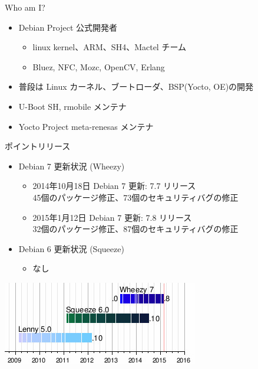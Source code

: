 \begin{frame}{Who am I?}

\begin{itemize}
\item Debian Project 公式開発者
\begin{itemize}
\item linux kernel、ARM、SH4、Mactel チーム
\item Bluez, NFC, Mozc, OpenCV, Erlang
\end{itemize}
\item 普段は Linux カーネル、ブートローダ、BSP(Yocto, OE)の開発
\item U-Boot SH, rmobile メンテナ
\item Yocto Project meta-renesas メンテナ
\end{itemize}

\end{frame}


\begin{frame}{ポイントリリース}

\begin{itemize}
\item Debian 7 更新状況 (Wheezy)
\begin{itemize}
\item 2014年10月18日 Debian 7 更新: 7.7 リリース\\
      45個のパッケージ修正、73個のセキュリティバグの修正
\item 2015年1月12日 Debian 7 更新: 7.8 リリース\\
      32個のパッケージ修正、87個のセキュリティバグの修正
\end{itemize}
\item Debian 6 更新状況 (Squeeze)
\begin{itemize}
\item なし
\end{itemize}
\end{itemize}

\begin{center}
\includegraphics[scale=0.7]{image201502/debian-release-201502-cut.jpg}
\end{center}

\end{frame}

